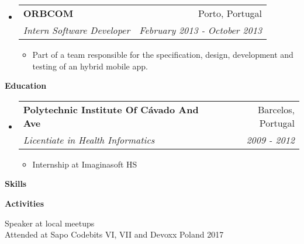 \documentclass[letterpaper,11pt]{article}
\makeatletter
\newcommand{\resitem}[1]{\item #1 \vspace{-2pt}}
\newcommand{\resheading}[1]{{\large \colorbox{mygrey}{\begin{minipage}{\textwidth}{\textbf{#1 \vphantom{p\^{E}}}}\end{minipage}}}}
\newcommand{\ressubheading}[4]{
	\begin{tabular*}{7.0in}{l@{\extracolsep{\fill}}r}
		\textbf{#1} & #2 \\
		\textit{#3} & \textit{#4} \\
	\end{tabular*}\vspace{-6pt}}
\makeatother
\begin{document}
\begin{itemize}
		\vspace{0.05in}
		
		\item
		\ressubheading{ORBCOM}{Porto, Portugal}{Intern Software Developer}{February 2013 - October 2013}
		\begin{itemize}
			\resitem{Part of a team responsible for the specification, design, development and testing of an hybrid mobile app.}
		\end{itemize}

	\end{itemize}

\resheading{Education}
	\begin{itemize}
		\item
		\ressubheading{Polytechnic Institute Of C\'avado And Ave}{Barcelos, Portugal}{Licentiate in Health Informatics}{2009 - 2012}
		\begin{itemize}
			\resitem{Internship at Imaginasoft HS}
		\end{itemize}
		
	\end{itemize}
	
	
	\resheading{Skills}
	
	\begin{description}
		\item{}
	\end{description}
	
	\resheading{Activities}
	
	\begin{description}
		\item[Speaker at local meetups]
		\item[Attended at Sapo Codebits VI, VII and Devoxx Poland 2017]
	\end{description}
	
\end{document}
